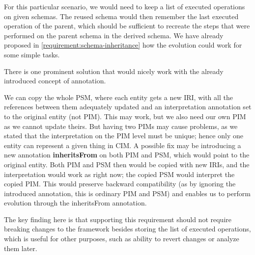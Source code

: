 For this particular scenario, we would need to keep a list of executed operations on given schemas. The reused schema would then remember the last executed operation of the parent, which should be sufficient to recreate the steps that were performed on the parent schema in the derived schema. We have already proposed in \autoref{requirement:schema-inheritance} how the evolution could work for some simple tasks.

There is one prominent solution that would nicely work with the already introduced concept of annotation.

We can copy the whole PSM, where each entity gets a new IRI, with all the references between them adequately updated and an interpretation annotation set to the original entity (not PIM). This may work, but we also need our own PIM as we cannot update theirs. But having two PIMs may cause problems, as we stated that the interpretation on the PIM level must be unique; hence only one entity can represent a given thing in CIM. A possible fix may be introducing a new annotation \textbf{inheritsFrom} on both PIM and PSM, which would point to the original entity. Both PIM and PSM then would be copied with new IRIs, and the interpretation would work as right now; the copied PSM would interpret the copied PIM. This would preserve backward compatibility (as by ignoring the introduced annotation, this is ordinary PIM and PSM) and enables us to perform evolution through the inheritsFrom annotation.

The key finding here is that supporting this requirement should not require breaking changes to the framework besides storing the list of executed operations, which is useful for other purposes, such as ability to revert changes or analyze them later.

